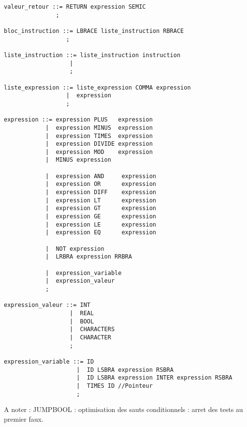 \documentclass[16pts]{report}
\begin{document}
\begin{lstlisting}
valeur_retour ::= RETURN expression SEMIC
               ;

bloc_instruction ::= LBRACE liste_instruction RBRACE
                  ;

liste_instruction ::= liste_instruction instruction
                   |
                   ;

liste_expression ::= liste_expression COMMA expression
                  |  expression
                  ;

expression ::= expression PLUS   expression
            |  expression MINUS  expression
            |  expression TIMES  expression
            |  expression DIVIDE expression
            |  expression MOD    expression
            |  MINUS expression

            |  expression AND     expression
            |  expression OR      expression
            |  expression DIFF    expression
            |  expression LT      expression
            |  expression GT      expression
            |  expression GE      expression
            |  expression LE      expression
            |  expression EQ      expression

            |  NOT expression
            |  LRBRA expression RRBRA

            |  expression_variable
            |  expression_valeur
            ;

expression_valeur ::= INT
                   |  REAL
                   |  BOOL
                   |  CHARACTERS
                   |  CHARACTER
                   ;

expression_variable ::= ID
                     |  ID LSBRA expression RSBRA
                     |  ID LSBRA expression INTER expression RSBRA
                     |  TIMES ID //Pointeur
                     ;

\end{lstlisting}
A noter : JUMPBOOL : optimisation des sauts conditionnels : arret des tests au premier faux.
\end{document}
